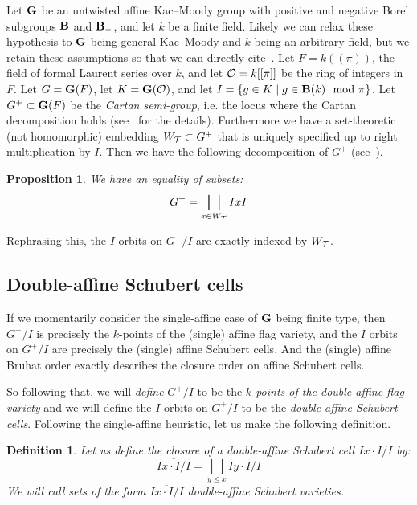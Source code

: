 \documentclass[10pt]{amsart}
\newtheorem{prop}[theo]{Proposition}
\newtheorem{defi}[theo]{Definition}
\begin{document}
Let $\mathbf{G}$ be an untwisted affine Kac--Moody group with positive and negative Borel subgroups $\mathbf{B}$ and $\mathbf{B}_-$, and let $k$ be a finite field. Likely we can relax these hypothesis to $\mathbf{G}$ being general Kac--Moody and $k$ being an arbitrary field, but we retain these assumptions so that we can directly cite~\cite{BKP}. Let $F = k((\pi))$, the field of formal Laurent series over $k$, and let $\mathcal{O} = k[[\pi]]$ be the ring of integers in $F$. Let $G = \mathbf{G}(F)$, let $K = \mathbf{G}(\mathcal{O})$, and let $I = \{ g \in K \mid g \in \mathbf{B}(k) \mod \pi \}$. Let $G^+ \subset \mathbf{G}(F)$ be the \emph{Cartan semi-group}, i.e. the locus where the Cartan decomposition holds (see~\cite{BKP,M} for the details). Furthermore we have a set-theoretic (not homomorphic) embedding $W_{\mathcal{T}} \subset G^+$ that is uniquely specified up to right multiplication by $I$. Then we have the following decomposition of $G^+$ (see~\cite[Proposition~3.4.2 and Lemma~3.4.3]{BKP}).
\begin{prop}
We have an equality of subsets:
\begin{equation}\label{eq:25}
G^+ = \bigsqcup_{x\in\WTits} I x I
\end{equation}
\end{prop}

Rephrasing this, the $I$-orbits on $G^+/I$ are exactly indexed by $W_{\mathcal{T}}$.

\subsection{Double-affine Schubert cells}

If we momentarily consider the single-affine case of $\mathbf{G}$ being finite type, then $G^+/I$ is precisely the $k$-points of the (single) affine flag variety, and the $I$ orbits on $G^+/I$ are precisely the (single) affine Schubert cells. And the (single) affine Bruhat order exactly describes the closure order on affine Schubert cells.

So following that, we will \emph{define} $G^+/I$ to be the \emph{$k$-points of the double-affine flag variety} and we will define the $I$ orbits on $G^+/I$ to be the \emph{double-affine Schubert cells}. Following the single-affine heuristic, let us make the following definition.

\begin{defi}
Let us define the \emph{closure} of a double-affine Schubert cell $Ix\cdot I/I$ by:
\begin{equation}\label{eq:26}
\overline{Ix \cdot I/I} = \bigsqcup_{y \leq x} I y \cdot I/I
\end{equation}
We will call sets of the form $\overline{Ix \cdot I/I}$ \emph{double-affine Schubert varieties}.
\end{defi}
\end{document}
